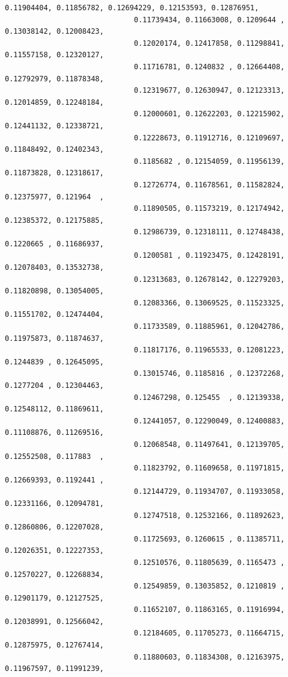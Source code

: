 \documentclass[11pt]{article}
\begin{document}
\begin{Verbatim}[commandchars=\\\{\}]
                              0.11904404, 0.11856782, 0.12694229, 0.12153593, 0.12876951,
                              0.11739434, 0.11663008, 0.1209644 , 0.13038142, 0.12008423,
                              0.12020174, 0.12417858, 0.11298841, 0.11557158, 0.12320127,
                              0.11716781, 0.1240832 , 0.12664408, 0.12792979, 0.11878348,
                              0.12319677, 0.12630947, 0.12123313, 0.12014859, 0.12248184,
                              0.12000601, 0.12622203, 0.12215902, 0.12441132, 0.12338721,
                              0.12228673, 0.11912716, 0.12109697, 0.11848492, 0.12402343,
                              0.1185682 , 0.12154059, 0.11956139, 0.11873828, 0.12318617,
                              0.12726774, 0.11678561, 0.11582824, 0.12375977, 0.121964  ,
                              0.11890505, 0.11573219, 0.12174942, 0.12385372, 0.12175885,
                              0.12986739, 0.12318111, 0.12748438, 0.1220665 , 0.11686937,
                              0.1200581 , 0.11923475, 0.12428191, 0.12078403, 0.13532738,
                              0.12313683, 0.12678142, 0.12279203, 0.11820898, 0.13054005,
                              0.12083366, 0.13069525, 0.11523325, 0.11551702, 0.12474404,
                              0.11733589, 0.11885961, 0.12042786, 0.11975873, 0.11874637,
                              0.11817176, 0.11965533, 0.12081223, 0.1244839 , 0.12645095,
                              0.13015746, 0.1185816 , 0.12372268, 0.1277204 , 0.12304463,
                              0.12467298, 0.125455  , 0.12139338, 0.12548112, 0.11869611,
                              0.12441057, 0.12290049, 0.12400883, 0.11108876, 0.11269516,
                              0.12068548, 0.11497641, 0.12139705, 0.12552508, 0.117883  ,
                              0.11823792, 0.11609658, 0.11971815, 0.12669393, 0.1192441 ,
                              0.12144729, 0.11934707, 0.11933058, 0.12331166, 0.12094781,
                              0.12747518, 0.12532166, 0.11892623, 0.12860806, 0.12207028,
                              0.11725693, 0.1260615 , 0.11385711, 0.12026351, 0.12227353,
                              0.12510576, 0.11805639, 0.1165473 , 0.12570227, 0.12268834,
                              0.12549859, 0.13035852, 0.1210819 , 0.12901179, 0.12127525,
                              0.11652107, 0.11863165, 0.11916994, 0.12038991, 0.12566042,
                              0.12184605, 0.11705273, 0.11664715, 0.12875975, 0.12767414,
                              0.11880603, 0.11834308, 0.12163975, 0.11967597, 0.11991239,

\end{Verbatim}
\end{document}
